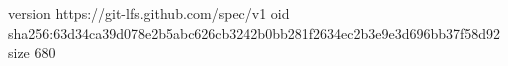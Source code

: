 version https://git-lfs.github.com/spec/v1
oid sha256:63d34ca39d078e2b5abc626cb3242b0bb281f2634ec2b3e9e3d696bb37f58d92
size 680

